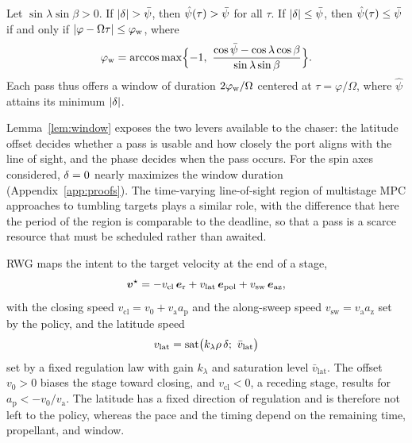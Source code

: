 \begin{lemma}\label{lem:window}
Let $\sin\lambda\sin\beta>0$. If $|\dlat|>\psig$, then $\hat\psi(\tau)>\bar\psi$ for all $\tau$. If $|\delta|\le\bar\psi$, then $\hat\psi(\tau)\le\bar\psi$ if and only if $|\varphi-\Omega\tau|\le\varphi_{\mathrm{w}}$, where
\begin{equation}\label{eq:halfwidth}
\phw=\arccos\max\Bigl\{-1,\ \frac{\cos\psig-\cos\lambda\cos\beta}{\sin\lambda\sin\beta}\Bigr\}.
\end{equation}
Each pass thus offers a window of duration $2\varphi_{\mathrm{w}}/\Omega$ centered at $\tau=\varphi/\Omega$, where $\hat\psi$ attains its minimum $|\delta|$.
\end{lemma}

Lemma~\ref{lem:window} exposes the two levers available to the chaser: the latitude offset decides whether a pass is usable and how closely the port aligns with the line of sight, and the phase decides when the pass occurs. For the spin axes considered, $\delta=0$ nearly maximizes the window duration (Appendix~\ref{app:proofs}). The time-varying line-of-sight region of multistage MPC approaches to tumbling targets \cite{dong2022aa} plays a similar role, with the difference that here the period of the region is comparable to the deadline, so that a pass is a scarce resource that must be scheduled rather than awaited.

RWG maps the intent to the target velocity at the end of a stage,
\begin{equation}\label{eq:vstar}
\boldsymbol{v}^{\star}=-v_{\mathrm{cl}}\,\boldsymbol{e}_{\mathrm{r}}+v_{\mathrm{lat}}\,\boldsymbol{e}_{\mathrm{pol}}+v_{\mathrm{sw}}\,\boldsymbol{e}_{\mathrm{az}},
\end{equation}
with the closing speed $v_{\mathrm{cl}}=v_{0}+v_{\mathrm{a}}a_{\mathrm{p}}$ and the along-sweep speed $v_{\mathrm{sw}}=v_{\mathrm{a}}a_{\mathrm{z}}$ set by the policy, and the latitude speed
\begin{equation}\label{eq:vlat}
v_{\mathrm{lat}}=\operatorname{sat}\bigl(k_{\lambda}\rho\,\delta;\ \bar v_{\mathrm{lat}}\bigr)
\end{equation}
set by a fixed regulation law with gain $k_{\lambda}$ and saturation level $\bar v_{\mathrm{lat}}$. The offset $v_{0}>0$ biases the stage toward closing, and $v_{\mathrm{cl}}<0$, a receding stage, results for $a_{\mathrm{p}}<-v_{0}/v_{\mathrm{a}}$. The latitude has a fixed direction of regulation and is therefore not left to the policy, whereas the pace and the timing depend on the remaining time, propellant, and window.

